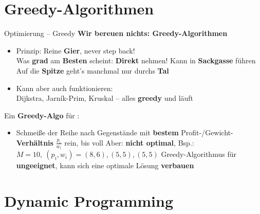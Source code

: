 \section{Greedy-Algorithmen}

\begin{frame}{Optimierung – Greedy}
	\textbf{Wir bereuen nichts: Greedy-Algorithmen} 
	\begin{itemize}
		\item Prinzip: Reine \textbf{Gier}, never step back! \\
		Was \textbf{grad} am \textbf{Besten} scheint: \textbf{Direkt} nehmen!
		\pause
		\implitem Kann in \textbf{Sackgasse} führen 
		\implitem Auf die \textbf{Spitze} geht's manchmal nur durchs \textbf{Tal}
		\pause
		\item Kann aber auch funktionieren: \\
		Dijkstra, Jarník-Prim, Kruskal – alles \textbf{greedy} und läuft \yop
	\end{itemize}
	\pause
	
	Ein \textbf{Greedy-Algo} für \textbf{\Knapsack}:
	\begin{itemize}
		\item Schmeiße der Reihe nach Gegenstände mit \textbf{bestem} Profit-/Gewicht-\textbf{Verhältnis} $\frac{p_i}{w_i}$ rein, bis voll
		\pause
		\implitem Aber: \textbf{nicht optimal}, Bsp.: \ $M=10, \ (p_i, w_i) = (8, 6), (5, 5), (5, 5)$ \crash
		\implitem Greedy-Algorithmus für \Knapsack \textbf{ungeeignet}, kann sich eine optimale Lösung \textbf{verbauen}\\
	\end{itemize}
\end{frame}

\section{Dynamic Programming}


